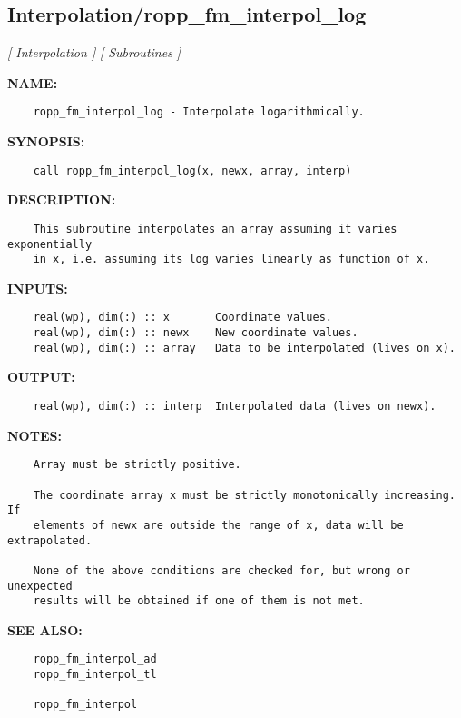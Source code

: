 \subsection{Interpolation/ropp\_fm\_interpol\_log}
\textsl{[ Interpolation ]}
\textsl{[ Subroutines ]}

\label{ch:robo51}
\label{ch:Interpolation_ropp_fm_interpol_log}
\textbf{NAME:}\hspace{0.08in}\begin{Verbatim}
    ropp_fm_interpol_log - Interpolate logarithmically.
\end{Verbatim}
\textbf{SYNOPSIS:}\hspace{0.08in}\begin{Verbatim}
    call ropp_fm_interpol_log(x, newx, array, interp)
\end{Verbatim}
\textbf{DESCRIPTION:}\hspace{0.08in}\begin{Verbatim}
    This subroutine interpolates an array assuming it varies exponentially 
    in x, i.e. assuming its log varies linearly as function of x.
\end{Verbatim}
\textbf{INPUTS:}\hspace{0.08in}\begin{Verbatim}
    real(wp), dim(:) :: x       Coordinate values.
    real(wp), dim(:) :: newx    New coordinate values.
    real(wp), dim(:) :: array   Data to be interpolated (lives on x).
\end{Verbatim}
\textbf{OUTPUT:}\hspace{0.08in}\begin{Verbatim}
    real(wp), dim(:) :: interp  Interpolated data (lives on newx).
\end{Verbatim}
\textbf{NOTES:}\hspace{0.08in}\begin{Verbatim}
    Array must be strictly positive.

    The coordinate array x must be strictly monotonically increasing. If
    elements of newx are outside the range of x, data will be extrapolated.

    None of the above conditions are checked for, but wrong or unexpected
    results will be obtained if one of them is not met. 
\end{Verbatim}
\textbf{SEE ALSO:}\hspace{0.08in}\begin{Verbatim}
    ropp_fm_interpol_ad
    ropp_fm_interpol_tl

    ropp_fm_interpol
\end{Verbatim}
